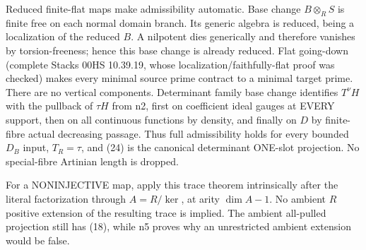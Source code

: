 Reduced finite-flat maps make admissibility automatic. Base change $B\otimes_RS$ is finite free on each normal domain branch. Its generic algebra is reduced, being a localization of the reduced $B$. A nilpotent dies generically and therefore vanishes by torsion-freeness; hence this base change is already reduced. Flat going-down (complete Stacks 00HS 10.39.19, whose localization/faithfully-flat proof was checked) makes every minimal source prime contract to a minimal target prime. There are no vertical components. Determinant family base change identifies $T^\nu H$ with the pullback of $\tau H$ from n2, first on coefficient ideal gauges at EVERY support, then on all continuous functions by density, and finally on $D$ by finite-fibre actual decreasing passage. Thus full admissibility holds for every bounded $D_B$ input, $T_R=\tau$, and (24) is the canonical determinant ONE-slot projection. No special-fibre Artinian length is dropped.

For a NONINJECTIVE map, apply this trace theorem intrinsically after the literal factorization through $A=R/\ker$, at arity $\dim A-1$. No ambient $R$ positive extension of the resulting trace is implied. The ambient all-pulled projection still has (18), while n5 proves why an unrestricted ambient extension would be false.
